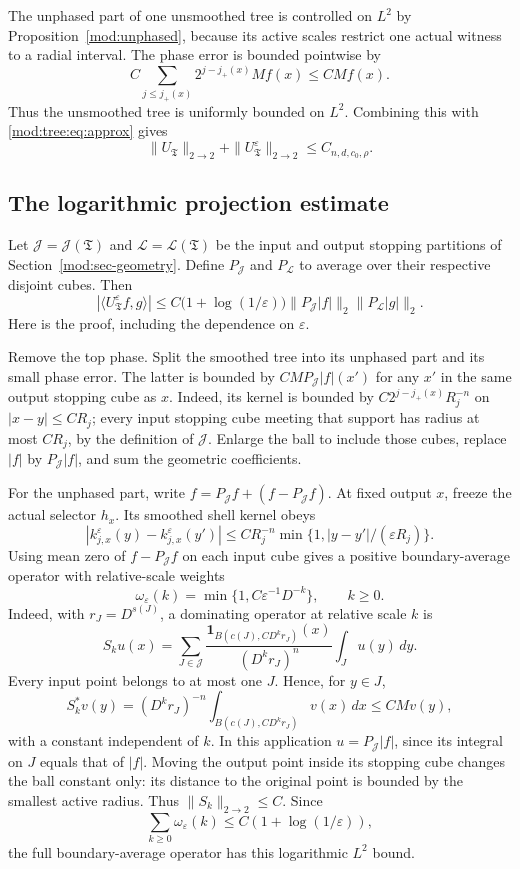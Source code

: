 \documentclass[11pt]{article}
\numberwithin{equation}{section}
\theoremstyle{remark}
\theoremstyle{definition}
\newcommand{\cL}{\mathcal L}
\newcommand{\TT}{\mathfrak T}
\newcommand{\cJ}{\mathcal J}
\begin{document}
The unphased part of one unsmoothed tree is controlled on $L^2$ by
Proposition~\ref{mod:unphased}, because its active scales restrict one
actual witness to a radial interval. The phase error is bounded
pointwise by
\[
 C\sum_{j\le j_+(x)}2^{j-j_+(x)}Mf(x)\le CMf(x).
\]
Thus the unsmoothed tree is uniformly bounded on $L^2$. Combining this
with \eqref{mod:tree:eq:approx} gives
\begin{equation}\label{mod:tree:eq:single-tree-uniform}
 \|U_\TT\|_{2\to2}+\|U_\TT^\varepsilon\|_{2\to2}
 \le C_{n,d,c_0,\rho}.
\end{equation}


\subsection{The logarithmic projection estimate}
Let $\cJ=\cJ(\TT)$ and $\cL=\cL(\TT)$ be the input and output stopping
partitions of Section~\ref{mod:sec-geometry}. Define $P_{\cJ}$ and $P_{\cL}$
to average over their respective disjoint cubes. Then
\begin{equation}\label{mod:tree:eq:projection}
 |\langle U_\TT^\varepsilon f,g\rangle|
 \le C\bigl(1+\log(1/\varepsilon)\bigr)
 \|P_{\cJ}|f|\|_2\|P_{\cL}|g|\|_2.
\end{equation}
Here is the proof, including the dependence on $\varepsilon$.

Remove the top phase. Split the smoothed tree into its unphased part and
its small phase error. The latter is bounded by $CM P_{\cJ}|f|(x')$ for
any $x'$ in the same output stopping cube as $x$. Indeed, its kernel is
bounded by $C2^{j-j_+(x)}R_j^{-n}$ on $|x-y|\le CR_j$; every input stopping
cube meeting that support has radius at most $CR_j$, by the definition
of $\cJ$. Enlarge the ball to include those cubes, replace $|f|$ by
$P_{\cJ}|f|$, and sum the geometric coefficients.

For the unphased part, write $f=P_{\cJ}f+(f-P_{\cJ}f)$. At fixed output
$x$, freeze the actual selector $h_x$. Its smoothed shell kernel obeys
\[
 |k_{j,x}^\varepsilon(y)-k_{j,x}^\varepsilon(y')|
 \le CR_j^{-n}\min\{1,|y-y'|/(\varepsilon R_j)\}.
\]
Using mean zero of $f-P_{\cJ}f$ on each input cube gives a positive
boundary-average operator with relative-scale weights
\[
 \omega_\varepsilon(k)=\min\{1,C\varepsilon^{-1}D^{-k}\},\qquad k\ge0.
\]
Indeed, with $r_J=D^{s(J)}$, a dominating operator at relative scale $k$ is
\[
 S_ku(x)=\sum_{J\in\cJ}
 \frac{\mathbf1_{B(c(J),C D^kr_J)}(x)}{(D^kr_J)^n}
 \int_Ju(y)\,dy.
\]
Every input point belongs to at most one $J$. Hence, for $y\in J$,
\[
 S_k^*v(y)=(D^kr_J)^{-n}
 \int_{B(c(J),C D^kr_J)}v(x)\,dx\le C Mv(y),
\]
with a constant independent of $k$. In this application
$u=P_{\cJ}|f|$, since its integral on $J$ equals that of $|f|$.
Moving the output point inside its stopping cube changes the ball
constant only: its distance to the original point is bounded by the
smallest active radius. Thus $\|S_k\|_{2\to2}\le C$. Since
\[
 \sum_{k\ge0}\omega_\varepsilon(k)\le C(1+\log(1/\varepsilon)),
\]
the full boundary-average operator has this logarithmic $L^2$ bound.
\end{document}
